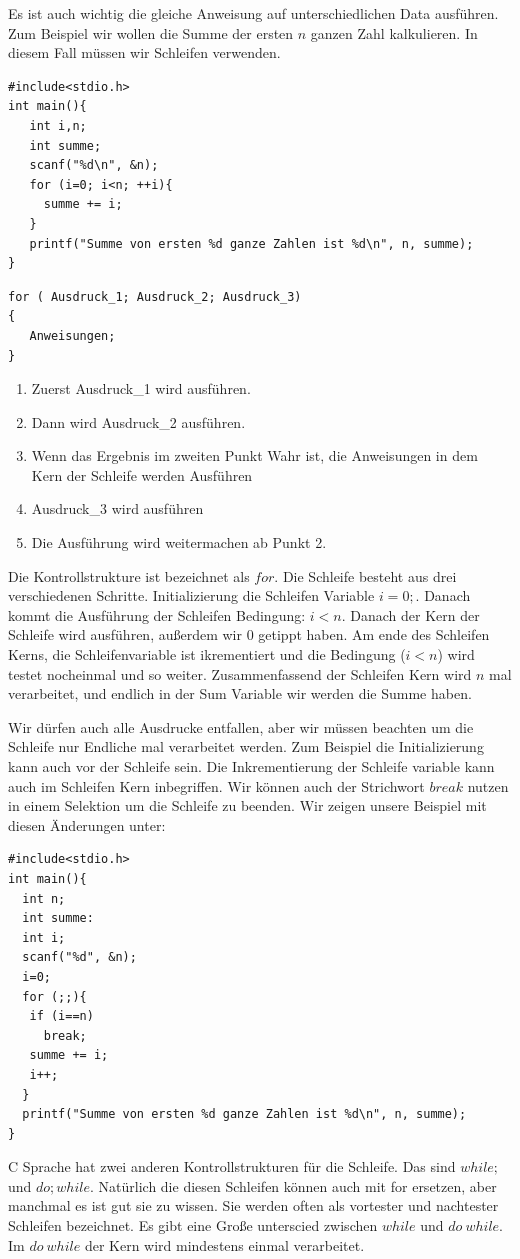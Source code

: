 \documentclass{article}[12pt]
\newenvironment{myalertblock}[1]{%
    \tcolorbox[beamer,%
    noparskip,breakable,
    colback=White,colframe=Bittersweet,%
    colbacklower=Peach!75!White,%
    title=#1]}%
    {\endtcolorbox}
\begin{document}
Es ist auch wichtig die gleiche Anweisung auf unterschiedlichen Data ausführen. Zum Beispiel wir wollen die Summe der ersten
$n$ ganzen Zahl kalkulieren. In diesem Fall müssen wir Schleifen verwenden. 
\begin{lstlisting}
#include<stdio.h>
int main(){
   int i,n;
   int summe;
   scanf("%d\n", &n);
   for (i=0; i<n; ++i){
     summe += i; 
   }
   printf("Summe von ersten %d ganze Zahlen ist %d\n", n, summe);
}
\end{lstlisting}
\begin{myalertblock}{For Kontrollstrukture}
\begin{lstlisting}
for ( Ausdruck_1; Ausdruck_2; Ausdruck_3) 
{
   Anweisungen;
}
\end{lstlisting}
\vspace{-1cm}
\begin{enumerate}
\item Zuerst Ausdruck\_1 wird ausführen.
\item Dann wird Ausdruck\_2 ausführen.
\item Wenn das Ergebnis im zweiten Punkt Wahr ist, die Anweisungen 
in dem Kern der Schleife werden Ausführen
\item Ausdruck\_3 wird ausführen
\item Die Ausführung wird weitermachen ab Punkt 2.
\end{enumerate}
\end{myalertblock}


Die Kontrollstrukture ist bezeichnet als $for$. Die Schleife besteht aus drei verschiedenen Schritte.
Initializierung die Schleifen Variable $i=0;$. Danach kommt die Ausführung der Schleifen Bedingung: $i<n$.
Danach der Kern der Schleife wird ausführen, außerdem wir 0 getippt haben. Am ende des Schleifen Kerns,
die Schleifenvariable ist ikrementiert und die Bedingung ($i<n$) wird testet nocheinmal und so weiter.
Zusammenfassend der Schleifen Kern wird $n$ mal verarbeitet, und endlich in der Sum Variable wir 
werden die Summe haben.

Wir dürfen auch alle Ausdrucke entfallen,  aber wir müssen beachten um die Schleife nur Endliche mal 
verarbeitet werden. Zum Beispiel die Initializierung kann auch vor der Schleife sein. Die Inkrementierung 
der Schleife variable kann auch im Schleifen Kern inbegriffen. Wir können auch der Strichwort $break$ nutzen 
in einem Selektion um die Schleife zu beenden. Wir zeigen unsere Beispiel mit diesen Änderungen unter:

\begin{lstlisting}
#include<stdio.h>
int main(){
  int n;
  int summe:
  int i;
  scanf("%d", &n);
  i=0;
  for (;;){
   if (i==n)
     break;
   summe += i;
   i++;
  }
  printf("Summe von ersten %d ganze Zahlen ist %d\n", n, summe);
}
\end{lstlisting}
C Sprache hat zwei anderen Kontrollstrukturen für die Schleife. Das sind $while;$ und $do; while$.
Natürlich die diesen Schleifen können auch mit for ersetzen, aber manchmal es ist gut sie zu wissen.
Sie werden often als vortester und nachtester Schleifen bezeichnet. Es gibt eine Große unterscied zwischen
$while$ und $do~while$. Im $do~while$ der Kern wird mindestens einmal verarbeitet. 
\end{document}
